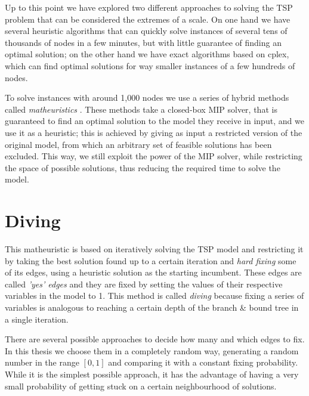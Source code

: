 Up to this point we have explored two different approaches to solving the TSP problem that can be considered the extremes of a scale. On one hand we have several heuristic algorithms that can quickly solve instances of several tens of thousands of nodes in a few minutes, but with little guarantee of finding an optimal solution; on the other hand we have exact algorithms based on cplex, which can find optimal solutions for way smaller instances of a few hundreds of nodes.

To solve instances with around 1,000 nodes we use a series of hybrid methods called \textit{matheuristics} \cite{Fischetti2016}. These methods take a closed-box MIP solver, that is guaranteed to find an optimal solution to the model they receive in input, and we use it as a heuristic; this is achieved by giving as input a restricted version of the original model, from which an arbitrary set of feasible solutions has been excluded. This way, we still exploit the power of the MIP solver, while restricting the space of possible solutions, thus reducing the required time to solve the model.

\section{Diving}

This matheuristic is based on iteratively solving the TSP model and restricting it by taking the best solution found up to a certain iteration and \textit{hard fixing} some of its edges, using a heuristic solution as the starting incumbent. These edges are called \textit{'yes' edges} and they are fixed by setting the values of their respective variables in the model to 1. This method is called \textit{diving} because fixing a series of variables is analogous to reaching a certain depth of the branch \& bound tree in a single iteration.

There are several possible approaches to decide how many and which edges to fix. In this thesis we choose them in a completely random way, generating a random number in the range $[0,1]$ and comparing it with a constant fixing probability. While it is the simplest possible approach, it has the advantage of having a very small probability of getting stuck on a certain neighbourhood of solutions.

\newpage

